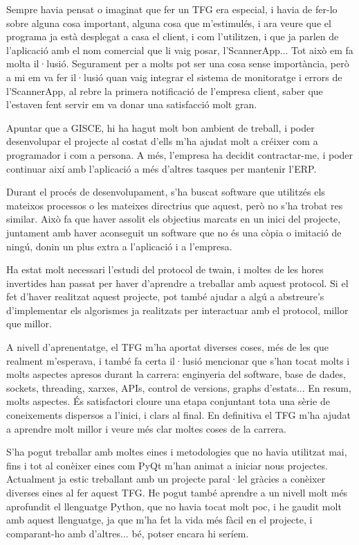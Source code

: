 \documentclass[letterpaper,11pt,catalan]{sphinxmanual}
\begin{document}
Sempre havia pensat o imaginat que fer un TFG era especial, i havia de fer-lo sobre alguna cosa
important, alguna cosa que m'estimulés, i ara veure que el programa ja està desplegat
a casa el client, i com l'utilitzen, i que ja parlen de l'aplicació amb el nom comercial
que li vaig posar, l'ScannerApp... Tot això em fa molta il·lusió. Segurament per a molts pot ser una cosa
sense importància, però a mi em va fer il·lusió quan vaig integrar el sistema de monitoratge
i errors de l'ScannerApp, al rebre la primera notificació de l'empresa client, saber que l'estaven
fent servir em va donar una satisfacció molt gran.

Apuntar que a GISCE, hi ha hagut molt bon ambient de treball, i poder desenvolupar el projecte al costat
d'ells m'ha ajudat molt a créixer com a programador i com a persona. A més, l'empresa ha decidit contractar-me, i poder
continuar així amb l'aplicació a més d'altres tasques per mantenir l'ERP.

Durant el procés de desenvolupament, s'ha buscat software que utilitzés els mateixos processos o
les mateixes directrius que aquest, però no s'ha trobat res similar. Això fa que haver assolit
els objectius marcats en un inici del projecte, juntament amb haver aconseguit un software que no
és una còpia o imitació de ningú, donin un plus extra a l'aplicació i a l'empresa.

Ha estat molt necessari l'estudi del protocol de twain, i moltes de les hores invertides han passat
per haver d'aprendre a treballar amb aquest protocol. Si el fet d'haver realitzat aquest projecte,
pot també ajudar a algú a abstreure's d'implementar els algorismes ja realitzats
per interactuar amb el protocol, millor que millor.

A nivell d'aprenentatge, el TFG m'ha aportat diverses coses, més de les que realment m'esperava, i també fa certa il·lusió mencionar
que s'han tocat molts i molts aspectes apresos durant la carrera: enginyeria del software, base de dades,
sockets, threading, xarxes, APIs, control de versions, graphs d'estats... En resum, molts aspectes.
És satisfactori cloure una etapa conjuntant tota una sèrie de coneixements dispersos a l'inici, i clars al final.
En definitiva el TFG m'ha ajudat a aprendre molt millor i veure més clar moltes coses
de la carrera.

S'ha pogut treballar amb moltes eines i metodologies que no havia utilitzat mai, fins i
tot al conèixer eines com PyQt m'han animat a iniciar nous projectes. Actualment ja estic treballant
amb un projecte paral·lel gràcies a conèixer diverses eines al fer aquest TFG.
He pogut també aprendre a un nivell molt més aprofundit el llenguatge Python, que no
havia tocat molt poc, i he gaudit molt amb aquest llenguatge, ja que m'ha fet la vida
més fàcil en el projecte, i comparant-ho amb d'altres... bé, potser encara hi seríem.
\end{document}
